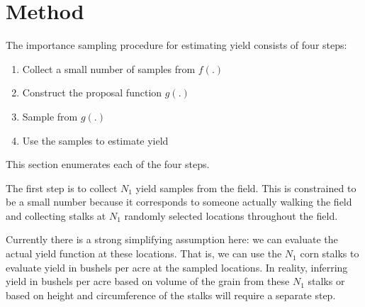 \documentclass{article} %
\begin{document}


\section{Method}

The importance sampling procedure for estimating yield consists of four steps:
\begin{enumerate}
\item Collect a small number of samples from $f(.)$
\item Construct the proposal function $g(.)$
\item Sample from $g(.)$
\item Use the samples to estimate yield
\end{enumerate}
This section enumerates each of the four steps.

The first step is to collect $N_1$ yield samples from the field. This is constrained to be a small number because it corresponds to someone actually walking the field and collecting stalks at $N_1$ randomly selected locations throughout the field.

Currently there is a strong simplifying assumption here: we can evaluate the actual yield function at these locations. That is, we can use the $N_1$ corn stalks to evaluate yield in bushels per acre at the sampled locations. In reality, inferring yield in bushels per acre based on volume of the grain from these $N_1$ stalks or based on height and circumference of the stalks will require a separate step.
\end{document}
